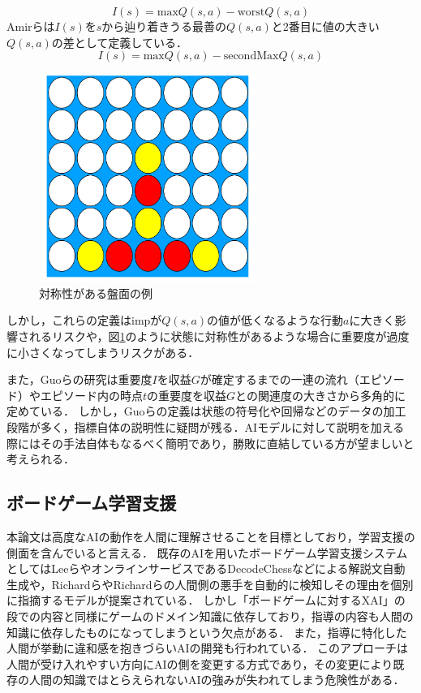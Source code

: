 \begin{equation}
	{I(s)= \textrm{max}Q(s, a)-\textrm{worst}Q(s, a)}
\end{equation}
Amirらは$I(s)$を$s$から辿り着きうる最善の$Q(s, a)$と2番目に値の大きい$Q(s, a)$の差として定義している．
\begin{equation}
    \label{imp}
	{I(s)= \textrm{max}Q(s, a)-\textrm{secondMax}Q(s, a)}
\end{equation}
\begin{figure}[htbp]
	\centering
	\includegraphics[width=200pt]{./figure/symmetry.png}
	\caption{対称性がある盤面の例}
	\label{fig:symmetry}
\end{figure}
しかし，これらの定義はimpが$Q(s, a)$の値が低くなるような行動$a$に大きく影響されるリスクや，図\ref{fig:symmetry}のように状態に対称性があるような場合に重要度が過度に小さくなってしまうリスクがある．

また，Guoらの研究\cite{EDGE}は重要度$I$を収益$G$が確定するまでの一連の流れ（エピソード）やエピソード内の時点$t$の重要度を収益$G$との関連度の大きさから多角的に定めている．
しかし，Guoらの定義は状態の符号化や回帰などのデータの加工段階が多く，指標自体の説明性に疑問が残る．AIモデルに対して説明を加える際にはその手法自体もなるべく簡明であり，勝敗に直結している方が望ましいと考えられる．





\subsection{ボードゲーム学習支援}
本論文は高度なAIの動作を人間に理解させることを目標としており，学習支援の側面を含んでいると言える．
既存のAIを用いたボードゲーム学習支援システムとしてはLeeら\cite{ChessComments}やオンラインサービスであるDecodeChess\cite{DecodeChess}などによる解説文自動生成や，Richard\cite{badMoves2016}らやRichard\cite{badMoves2017}らの人間側の悪手を自動的に検知しその理由を個別に指摘するモデルが提案されている．
しかし「ボードゲームに対するXAI」の段での内容と同様にゲームのドメイン知識に依存しており，指導の内容も人間の知識に依存したものになってしまうという欠点がある．
また，指導に特化した人間が挙動に違和感を抱きづらいAIの開発も行われている\cite{natural}\cite{maia}．
このアプローチは人間が受け入れやすい方向にAIの側を変更する方式であり，その変更により既存の人間の知識ではとらえられないAIの強みが失われてしまう危険性がある．


